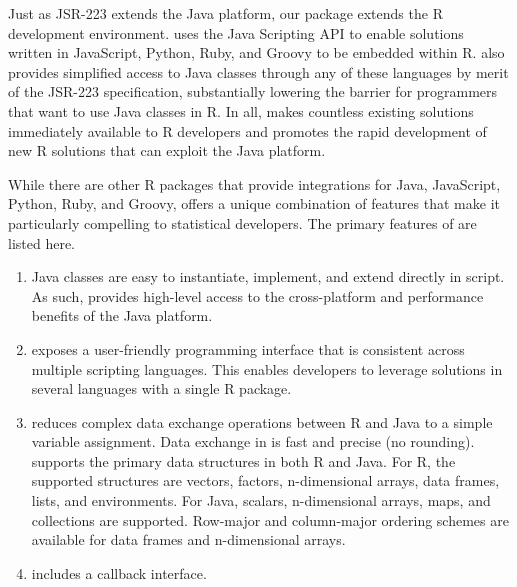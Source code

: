 Just as JSR-223 extends the Java platform, our  package extends the R development environment.  uses the Java Scripting API to enable solutions written in JavaScript, Python, Ruby, and Groovy to be embedded within R.  also provides simplified access to Java classes through any of these languages by merit of the JSR-223 specification, substantially lowering the barrier for programmers that want to use Java classes in R. In all,  makes countless existing solutions immediately available to R developers and promotes the rapid development of new R solutions that can exploit the Java platform.

While there are other R packages that provide integrations for Java, JavaScript, Python, Ruby, and Groovy,  offers a unique combination of features that make it particularly compelling to statistical developers. The primary features of  are listed here.

\begin{enumerate}
\item Java classes are easy to instantiate, implement, and extend directly in script. As such,  provides high-level access to the cross-platform and performance benefits of the Java platform.

\item {} exposes a user-friendly programming interface that is consistent across multiple scripting languages. This enables developers to leverage solutions in several languages with a single R package.

\item {} reduces complex data exchange operations between R and Java to a simple variable assignment. Data exchange in  is fast and precise (no rounding).  supports the primary data structures in both R and Java. For R, the supported structures are vectors, factors, n-dimensional arrays, data frames, lists, and environments. For Java, scalars, n-dimensional arrays, maps, and collections are supported. Row-major and column-major ordering schemes are available for data frames and n-dimensional arrays.

\item {} includes a callback interface.
\end{enumerate}

